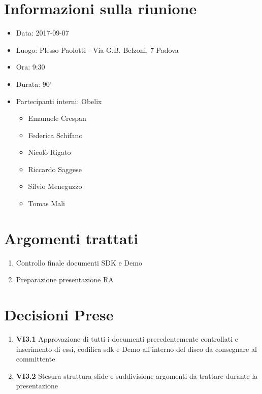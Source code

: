 \documentclass[10 pt,a4paper, openany]{article}
\date{}
\begin{document}
\paginatitolo
\section{Informazioni sulla riunione}

\begin{itemize}
\item[] Data: 2017-09-07
\item[] Luogo: Plesso Paolotti - Via G.B. Belzoni, 7 Padova 
\item[] Ora: 9:30
\item[] Durata: 90'
\item[] Partecipanti interni: Obelix
  \begin{itemize}
  \item[] Emanuele Crespan
  \item[] Federica Schifano
  \item[] Nicolò Rigato
  \item[] Riccardo Saggese
  \item[] Silvio Meneguzzo
  \item[] Tomas Mali
 \end{itemize}
\end{itemize}

\section{Argomenti trattati}
\begin{enumerate}
	\item Controllo finale documenti SDK e Demo
	\item Preparazione presentazione RA


	
\end{enumerate}


\section{Decisioni Prese}
\begin{enumerate}
	\item \textbf{VI3.1} Approvazione di tutti i documenti precedentemente controllati e inserimento di essi, codifica sdk e Demo all'interno del disco da consegnare al committente 

	
	\item \textbf{VI3.2} Stesura struttura slide e suddivisione argomenti da trattare durante la presentazione
	
		
	
\end{enumerate}
\end{document}
